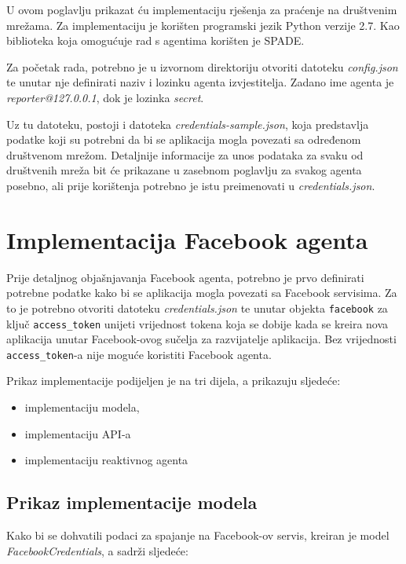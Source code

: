 \documentclass[a4paper,12pt]{foi}
\begin{document}
U ovom poglavlju prikazat ću implementaciju rješenja za praćenje na društvenim mrežama. Za implementaciju je korišten programski jezik Python verzije 2.7. Kao biblioteka koja omogućuje rad s agentima korišten je SPADE.

Za početak rada, potrebno je u izvornom direktoriju otvoriti datoteku \textit{config.json} te unutar nje definirati naziv i lozinku agenta izvjestitelja. Zadano ime agenta je \textit{reporter@127.0.0.1}, dok je lozinka \textit{secret}.

Uz tu datoteku, postoji i datoteka \textit{credentials-sample.json}, koja predstavlja podatke koji su potrebni da bi se aplikacija mogla povezati sa određenom društvenom mrežom. Detaljnije informacije za unos podataka za svaku od društvenih mreža bit će prikazane u zasebnom poglavlju za svakog agenta posebno, ali prije korištenja potrebno je istu preimenovati u \textit{credentials.json}.

\section{Implementacija Facebook agenta}

Prije detaljnog objašnjavanja Facebook agenta, potrebno je prvo definirati potrebne podatke kako bi se aplikacija mogla povezati sa Facebook servisima. 
Za to je potrebno otvoriti datoteku \textit{credentials.json} te unutar objekta \texttt{facebook} za ključ \texttt{access\_token} unijeti vrijednost tokena koja se dobije kada se kreira nova aplikacija unutar Facebook-ovog sučelja za razvijatelje aplikacija. Bez vrijednosti \texttt{access\_token}-a nije moguće koristiti Facebook agenta.

Prikaz implementacije podijeljen je na tri dijela, a prikazuju sljedeće:

\begin{itemize}
\item{implementaciju modela,}
\item{implementaciju API-a}
\item{implementaciju reaktivnog agenta}
\end{itemize}

\subsection{Prikaz implementacije modela}

Kako bi se dohvatili podaci za spajanje na Facebook-ov servis, kreiran je model \textit{FacebookCredentials}, a sadrži sljedeće:
\end{document}
